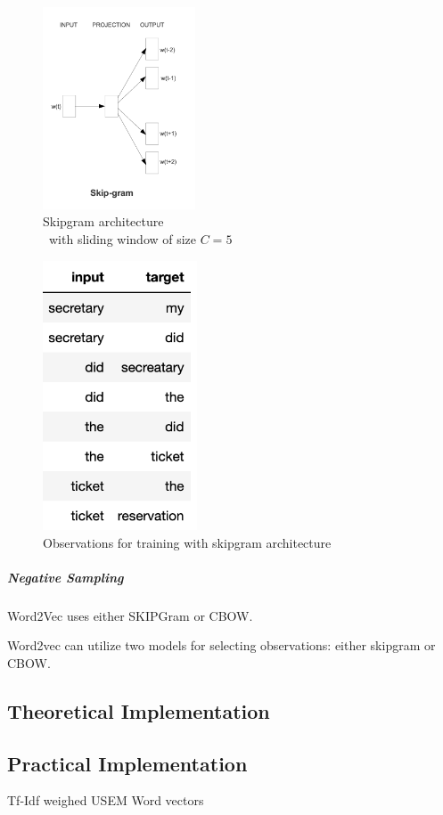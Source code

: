             \begin{figure}[ht]
                \centering
                \includegraphics[height=6cm]{Bilder/word2vec/architecture_skipgram.png}
                \caption{Skipgram architecture\\\ with sliding window of size $C=5$ }
                \label{fig:cbow-architecture}
            \end{figure}
        
            \begin{figure}[ht]
                \centering
                \includegraphics[height=8cm]{Bilder/word2vec/skipgram.png}
                \caption{Observations for training with skipgram architecture}
                \label{fig:cbow-architecture}
            \end{figure}
            
            
            \subparagraph{Negative Sampling}
            
            
            Word2Vec uses either SKIPGram or CBOW.
            
            Word2vec can utilize two models for selecting observations: either skipgram or \ac{CBOW}. 
            
            \subsection{Theoretical Implementation}
            
            \subsection{Practical Implementation}
            Tf-Idf weighed USEM Word vectors